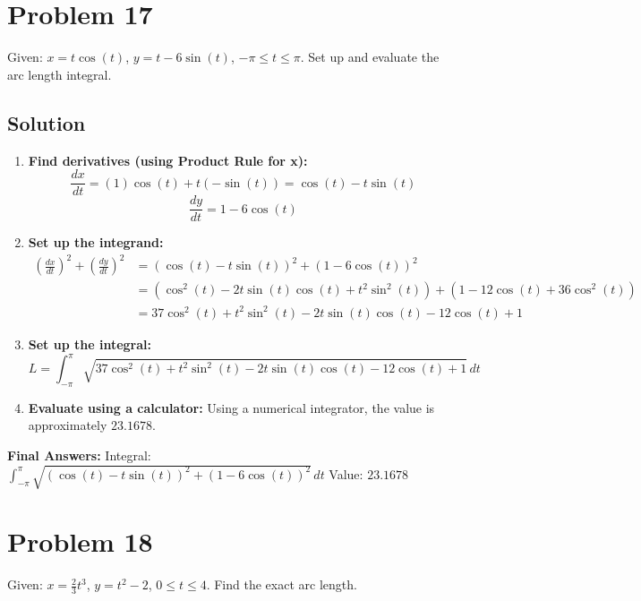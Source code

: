 \documentclass{article}
\begin{document}
\section{Problem 17}
Given: $x = t\cos(t)$, $y = t - 6\sin(t)$, $-\pi \le t \le \pi$. Set up and evaluate the arc length integral.

\subsection*{Solution}
\begin{enumerate}
    \item \textbf{Find derivatives (using Product Rule for x):}
    \[ \frac{dx}{dt} = (1)\cos(t) + t(-\sin(t)) = \cos(t) - t\sin(t) \]
    \[ \frac{dy}{dt} = 1 - 6\cos(t) \]
    \item \textbf{Set up the integrand:}
    \begin{align*}
    (\frac{dx}{dt})^2 + (\frac{dy}{dt})^2 &= (\cos(t) - t\sin(t))^2 + (1 - 6\cos(t))^2 \\
    &= (\cos^2(t) - 2t\sin(t)\cos(t) + t^2\sin^2(t)) + (1 - 12\cos(t) + 36\cos^2(t)) \\
    &= 37\cos^2(t) + t^2\sin^2(t) - 2t\sin(t)\cos(t) - 12\cos(t) + 1
    \end{align*}
    \item \textbf{Set up the integral:}
    \[ L = \int_{-\pi}^{\pi} \sqrt{37\cos^2(t) + t^2\sin^2(t) - 2t\sin(t)\cos(t) - 12\cos(t) + 1} \, dt \]
    \item \textbf{Evaluate using a calculator:}
    Using a numerical integrator, the value is approximately $23.1678$.
\end{enumerate}
\textbf{Final Answers:}
Integral: $\displaystyle \int_{-\pi}^{\pi} \sqrt{(\cos(t) - t\sin(t))^2 + (1 - 6\cos(t))^2} \, dt$
Value: $23.1678$

\section{Problem 18}
Given: $x = \frac{2}{3}t^3$, $y = t^2 - 2$, $0 \le t \le 4$. Find the exact arc length.
\end{document}
